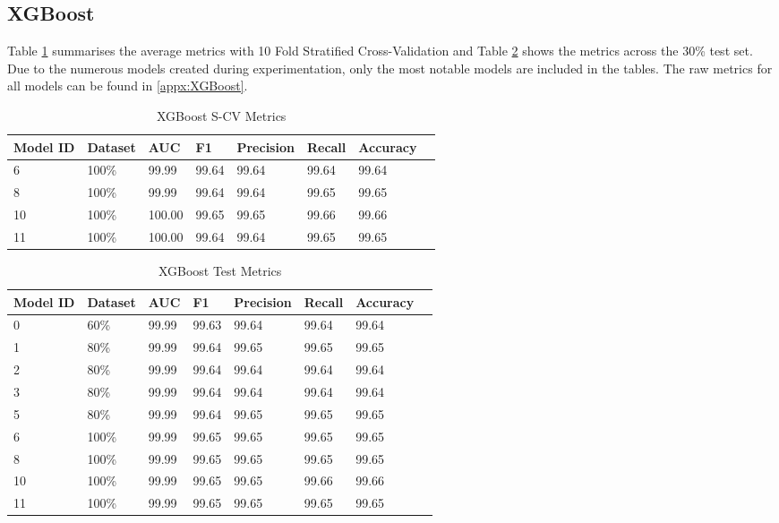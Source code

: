 \subsection{XGBoost}

 Table \ref{tab:xgb-scv-metrics} summarises the average metrics with 10 Fold Stratified Cross-Validation and Table \ref{tab:xgb-test-metrics} shows the metrics across the 30\% test set. Due to the numerous models created during experimentation, only the most notable models are included in the tables. The raw metrics for all models can be found in \ref{appx:XGBoost}. 

\begin{table}[h]
\centering
\caption{XGBoost S-CV Metrics}
\label{tab:xgb-scv-metrics}
\begin{tabular}{|l|l|l|l|l|l|l|l|}
\hline
\textbf{Model ID} & \textbf{Dataset} & \textbf{AUC} & \textbf{F1} & \textbf{Precision} & \textbf{Recall} & \textbf{Accuracy}  \\ \hline
6 & 100\% & 99.99 & 99.64 & 99.64 & 99.64 & 99.64 \\ \hline
8 & 100\% & 99.99 & 99.64 & 99.64 & 99.65 & 99.65 \\ \hline
10 & 100\% & 100.00 & 99.65 & 99.65 & 99.66 & 99.66 \\ \hline
11 & 100\% & 100.00 & 99.64 & 99.64 & 99.65 & 99.65 \\ \hline
\end{tabular}
\end{table}

\begin{table}[H]
\centering
\caption{XGBoost Test Metrics}
\label{tab:xgb-test-metrics}
\begin{tabular}{|l|l|l|l|l|l|l|l|}
\hline
\textbf{Model ID} & \textbf{Dataset} & \textbf{AUC} & \textbf{F1} & \textbf{Precision} & \textbf{Recall} & \textbf{Accuracy}  \\ \hline
0 & 60\% & 99.99 & 99.63 & 99.64 & 99.64 & 99.64 \\ \hline
1 & 80\% & 99.99 & 99.64 & 99.65 & 99.65 & 99.65 \\ \hline
2 & 80\% & 99.99 & 99.64 & 99.64 & 99.64 & 99.64 \\ \hline
3 & 80\% & 99.99 & 99.64 & 99.64 & 99.64 & 99.64 \\ \hline
5 & 80\% & 99.99 & 99.64 & 99.65 & 99.65 & 99.65 \\ \hline
6 & 100\% & 99.99 & 99.65 & 99.65 & 99.65 & 99.65 \\ \hline
8 & 100\% & 99.99 & 99.65 & 99.65 & 99.65 & 99.65 \\ \hline
10 & 100\% & 99.99 & 99.65 & 99.65 & 99.66 & 99.66 \\ \hline
11 & 100\% & 99.99 & 99.65 & 99.65 & 99.65 & 99.65 \\ \hline
\end{tabular}
\end{table}

